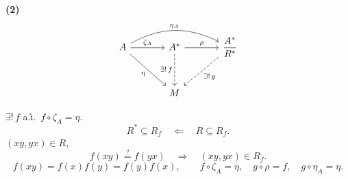 \medskip
\noindent\textbf{(2)}
\[
\begin{tikzcd}[column sep=large, row sep=large]
A \arrow[r,"\zeta_A"] \arrow[dr,"\eta"']
  \arrow[rr,bend left=28,"\eta_A"]
  & A^* \arrow[r,"\rho"] \arrow[d,dashed,"{\exists!\,f}"']
  & \dfrac{A^*}{R^*} \arrow[dl,dashed,"{\exists!\,g}"] \\
& M &
\end{tikzcd}
\]

\noindent $\exists!\,f$ a.\^{\i}.\ $f\circ\zeta_A=\eta$.
\[
R^*\subseteq R_f\quad\Longleftarrow\quad R\subseteq R_f.
\]
\noindent $(xy,yx)\in R$,
\[
f(xy)\overset{?}{=}f(yx)
\quad\Longrightarrow\quad (xy,yx)\in R_f.
\]
\[
f(xy)=f(x)f(y)=f(y)f(x),
\qquad f\circ\zeta_A=\eta,\quad g\circ\rho=f,\quad
 g\circ\eta_A=\eta.
\]

